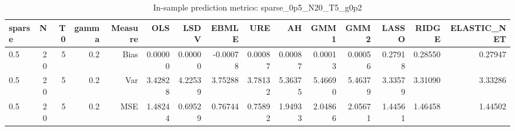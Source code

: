 \begin{table}[!htbp]\centering
\caption{In-sample prediction metrics: sparse_0p5_N20_T5_g0p2}
\label{tab:table2_sparse_0p5_N20_T5_g0p2}
\begin{tabular}{lrrrrrrrrrrrrrr}
\hline
sparse & N & T0 & gamma & Measure & OLS & LSDV & EBMLE & URE & AH & GMM1 & GMM2 & LASSO & RIDGE & ELASTIC_NET \\
\hline
0.5 & 20 & 5 & 0.2 & Bias & 0.00000 & 0.00000 & -0.00078 & 0.00087 & 0.00087 & 0.00013 & 0.00056 & 0.27918 & 0.28550 & 0.27947 \\
0.5 & 20 & 5 & 0.2 & Var & 3.42828 & 4.22539 & 3.75288 & 3.78132 & 5.36375 & 5.46690 & 5.46379 & 3.33579 & 3.31090 & 3.33286 \\
0.5 & 20 & 5 & 0.2 & MSE & 1.48244 & 0.69529 & 0.76744 & 0.75892 & 1.94933 & 2.04866 & 2.05671 & 1.44561 & 1.46458 & 1.44502 \\
\hline
\end{tabular}
\end{table}

